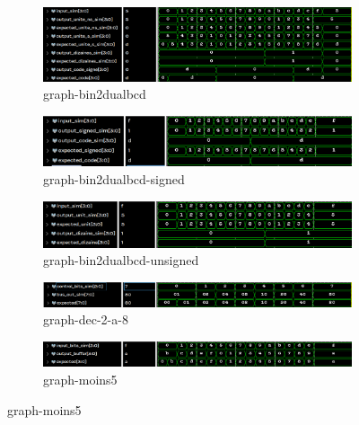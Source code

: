\newpage
\appendix

\begin{figure}[H]

	\begin{subfigure}{.496\linewidth}
		\centering
		\includegraphics[width=\textwidth]{assets/img/graph-bin2dualbcd.png}
		\caption{graph-bin2dualbcd}
	\end{subfigure}
	\begin{subfigure}{.496\linewidth}
		\centering
		\includegraphics[width=\textwidth]{assets/img/graph-bin2dualbcd-signed.png}
		\caption{graph-bin2dualbcd-signed}
	\end{subfigure}
	\begin{subfigure}{.496\linewidth}
		\centering
		\includegraphics[width=\textwidth]{assets/img/graph-bin2dualbcd-unsigned.png}
		\caption{graph-bin2dualbcd-unsigned}
	\end{subfigure}
	\begin{subfigure}{.496\linewidth}
		\centering
		\includegraphics[width=\textwidth]{assets/img/graph-dec-2-a-8.png}
		\caption{graph-dec-2-a-8}
	\end{subfigure}
	\begin{subfigure}{.496\linewidth}
		\centering
		\includegraphics[width=\textwidth]{assets/img/graph-moins5.png}
		\caption{graph-moins5}
	\end{subfigure}

\end{figure}
